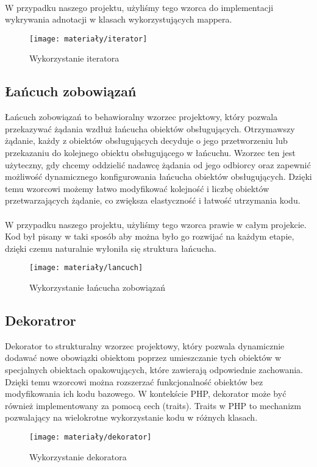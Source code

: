 \paragraph{} W przypadku naszego projektu, użyliśmy tego wzorca do implementacji wykrywania adnotacji w klasach wykorzystujących mappera.

\begin{figure}[ht]
	\centering
	\texttt{[image: materiały/iterator]}
	\caption{Wykorzystanie iteratora}
\end{figure}

\subsection{Łańcuch zobowiązań}
Łańcuch zobowiązań to behawioralny wzorzec projektowy, który pozwala przekazywać żądania wzdłuż łańcucha obiektów obsługujących. Otrzymawszy żądanie, każdy z obiektów obsługujących decyduje o jego przetworzeniu lub przekazaniu do kolejnego obiektu obsługującego w łańcuchu. Wzorzec ten jest użyteczny, gdy chcemy oddzielić nadawcę żądania od jego odbiorcy oraz zapewnić możliwość dynamicznego konfigurowania łańcucha obiektów obsługujących. Dzięki temu wzorcowi możemy łatwo modyfikować kolejność i liczbę obiektów przetwarzających żądanie, co zwiększa elastyczność i łatwość utrzymania kodu.

\paragraph{} W przypadku naszego projektu, użyliśmy tego wzorca prawie w całym projekcie. Kod był pisany w taki sposób aby można było go rozwijać na każdym etapie, dzięki czemu naturalnie wyłoniła się struktura łańcucha.

\begin{figure}[ht]
	\centering
	\texttt{[image: materiały/lancuch]}
	\caption{Wykorzystanie łańcucha zobowiązań}
\end{figure}

\subsection{Dekoratror}
Dekorator to strukturalny wzorzec projektowy, który pozwala dynamicznie dodawać nowe obowiązki obiektom poprzez umieszczanie tych obiektów w specjalnych obiektach opakowujących, które zawierają odpowiednie zachowania. Dzięki temu wzorcowi można rozszerzać funkcjonalność obiektów bez modyfikowania ich kodu bazowego. W kontekście PHP, dekorator może być również implementowany za pomocą cech (traits). Traits w PHP to mechanizm pozwalający na wielokrotne wykorzystanie kodu w różnych klasach.

\begin{figure}[ht]
	\centering
	\texttt{[image: materiały/dekorator]}
	\caption{Wykorzystanie dekoratora}
\end{figure} 